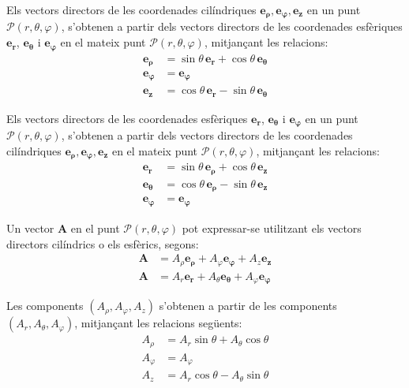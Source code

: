 \documentclass[catalan,a4paper,twoside,11pt]{article}
\begin{document}
Els vectors directors de les coordenades cilíndriques $\boldsymbol{e_\rho},\boldsymbol{e_\varphi},\boldsymbol{e_z}$  en un punt $\mathscr{P}(r,\theta,\varphi)$, s'obtenen a partir dels vectors directors de les coordenades esfèriques $\boldsymbol{e_r}$, $\boldsymbol{e_\theta}$ i $\boldsymbol{e_\varphi}$ en el mateix punt $\mathscr{P}(r,\theta,\varphi)$,
mitjançant les relacions:
\begin{subequations}\begin{align}
		\boldsymbol{e_\rho} &=\sin\theta\,\boldsymbol{e_r}+
		\cos\theta\,\boldsymbol{e_\theta}\\
		\boldsymbol{e_\varphi}&=\boldsymbol{e_\varphi}\\
		\boldsymbol{e_z} &=\cos\theta\,\boldsymbol{e_r}-
		\sin\theta\,\boldsymbol{e_\theta}
\end{align}\end{subequations}


Els vectors directors de les coordenades esfèriques  $\boldsymbol{e_r}$, $\boldsymbol{e_\theta}$ i $\boldsymbol{e_\varphi}$ en un punt $\mathscr{P}(r,\theta,\varphi)$, s'obtenen a partir dels vectors directors de les coordenades cilíndriques $\boldsymbol{e_\rho},\boldsymbol{e_\varphi},\boldsymbol{e_z}$ en el mateix punt $\mathscr{P}(r,\theta,\varphi)$, mitjançant les relacions:
\begin{subequations}\begin{align}
    \boldsymbol{e_r} &=\sin\theta\,\boldsymbol{e_\rho}+\cos\theta\,\boldsymbol{e_z}\\
    \boldsymbol{e_\theta}
    &=\cos\theta\,\boldsymbol{e_\rho}-\sin\theta\,\boldsymbol{e_z}\\
    \boldsymbol{e_\varphi}&=\boldsymbol{e_\varphi}
\end{align}\end{subequations}

Un vector $\boldsymbol{A}$ en el punt $\mathscr{P}(r, \theta, \varphi)$ pot expressar-se utilitzant els vectors directors cilíndrics o els esfèrics, segons:
\begin{subequations}\begin{align}
		\boldsymbol{A} &= A_\rho \boldsymbol{e_\rho} + A_\varphi \boldsymbol{e_\varphi} + A_z \boldsymbol{e_z} \\
		\boldsymbol{A} &= A_r  \boldsymbol{e_r} + A_\theta \boldsymbol{e_\theta} + A_\varphi \boldsymbol{e_\varphi}
\end{align}\end{subequations}

Les components   $(A_\rho, A_\varphi, A_z)$  s'obtenen a partir de les  components  $(A_r, A_\theta, A_\varphi)$, mitjançant les relacions següents:
\begin{subequations}\begin{align}
    A_\rho &= A_r\sin\theta+A_\theta\cos\theta \\
    A_\varphi &= A_\varphi  \\
    A_z &= A_r\cos\theta-A_\theta\sin\theta  
\end{align}\end{subequations}
\end{document}
